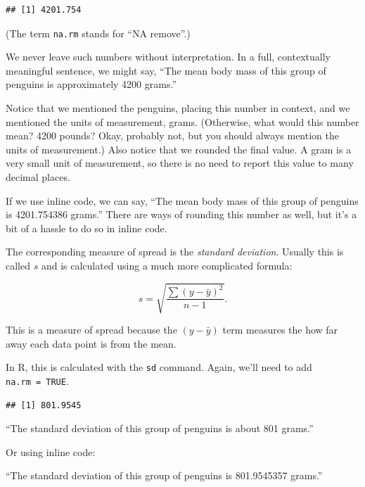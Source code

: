 \documentclass[
]{book}
\newenvironment{Shaded}{\begin{snugshade}}{\end{snugshade}}
\newcommand{\AttributeTok}[1]{\textcolor[rgb]{0.77,0.63,0.00}{#1}}
\newcommand{\ConstantTok}[1]{\textcolor[rgb]{0.00,0.00,0.00}{#1}}
\newcommand{\FunctionTok}[1]{\textcolor[rgb]{0.00,0.00,0.00}{#1}}
\newcommand{\NormalTok}[1]{#1}
\newcommand{\SpecialCharTok}[1]{\textcolor[rgb]{0.00,0.00,0.00}{#1}}
\begin{document}
\begin{verbatim}
## [1] 4201.754
\end{verbatim}

(The term \texttt{na.rm} stands for ``NA remove''.)

We never leave such numbers without interpretation. In a full, contextually meaningful sentence, we might say, ``The mean body mass of this group of penguins is approximately 4200 grams.''

Notice that we mentioned the penguins, placing this number in context, and we mentioned the units of measurement, grams. (Otherwise, what would this number mean? 4200 pounds? Okay, probably not, but you should always mention the units of measurement.) Also notice that we rounded the final value. A gram is a very small unit of measurement, so there is no need to report this value to many decimal places.

If we use inline code, we can say, ``The mean body mass of this group of penguins is 4201.754386 grams.'' There are ways of rounding this number as well, but it's a bit of a hassle to do so in inline code.

The corresponding measure of spread is the \emph{standard deviation}. Usually this is called \(s\) and is calculated using a much more complicated formula:

\[
s = \sqrt{\frac{\sum (y - \bar{y})^2}{n - 1}}.
\]

This is a measure of spread because the \((y - \bar{y})\) term measures the how far away each data point is from the mean.

In R, this is calculated with the \texttt{sd} command. Again, we'll need to add \texttt{na.rm\ =\ TRUE}.

\begin{Shaded}
\end{Shaded}

\begin{verbatim}
## [1] 801.9545
\end{verbatim}

``The standard deviation of this group of penguins is about 801 grams.''

Or using inline code:

``The standard deviation of this group of penguins is 801.9545357 grams.''
\end{document}
